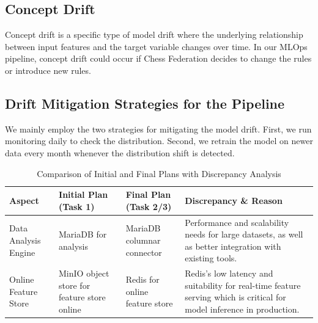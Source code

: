

\subsection{Concept Drift}
Concept drift is a specific type of model drift where the underlying relationship between input features and the target variable changes over time. In our MLOps pipeline, concept drift could occur if Chess Federation decides to change the rules or introduce new rules. 

\subsection{Drift Mitigation Strategies for the Pipeline}
We mainly employ the two strategies for mitigating the model drift. First, we run monitoring daily to check the distribution. Second, we retrain the model on newer data every month whenever the distribution shift is detected.

\begin{table}[htbp]
\centering
\caption{Comparison of Initial and Final Plans with Discrepancy Analysis}
\begin{tabularx}{\textwidth}{@{} >{\raggedright\arraybackslash}p{2.5cm}
                                >{\raggedright\arraybackslash}p{3cm}
                                >{\raggedright\arraybackslash}p{3cm}
                                X @{}}
\toprule
\textbf{Aspect} &
\textbf{Initial Plan (Task 1)} &
\textbf{Final Plan (Task 2/3)} &
\textbf{Discrepancy \& Reason} \\
\midrule

Data Analysis Engine
& MariaDB for analysis
& MariaDB columnar connector
& Performance and scalability needs for large datasets, as well as better integration with existing tools. \\

\midrule

Online Feature Store
& MinIO object store for feature store online
& Redis for online feature store
& Redis's low latency and suitability for real-time feature serving which is critical for model inference in production. \\

\bottomrule
\end{tabularx}
\end{table}
